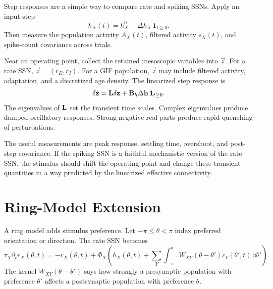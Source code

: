 Step responses are a simple way to compare rate and spiking SSNs. Apply an input step
%
\begin{equation}
  h_X(t)
  =
  h_X^0+\Delta h_X\,\mathbf{1}_{t\ge 0}.
  \label{eq:ssn-step-input}
\end{equation}
%
Then measure the population activity $A_X(t)$, filtered activity $s_X(t)$, and spike-count covariance across trials.

Near an operating point, collect the retained mesoscopic variables into $\vec z$. For a rate SSN, $\vec z=(r_E,r_I)$. For a GIF population, $\vec z$ may include filtered activity, adaptation, and a discretized age density. The linearized step response is
%
\begin{equation}
  \delta\dot{\mathbf{z}}
  =
  \mathbf{L}\delta\mathbf{z}+\mathbf{B}_h\Delta\mathbf{h}\,\mathbf{1}_{t\ge 0}.
  \label{eq:gif-ssn-step-linearization}
\end{equation}
%
The eigenvalues of $\mathbf{L}$ set the transient time scales. Complex eigenvalues produce damped oscillatory responses. Strong negative real parts produce rapid quenching of perturbations.

The useful measurements are peak response, settling time, overshoot, and post-step covariance. If the spiking SSN is a faithful mechanistic version of the rate SSN, the stimulus should shift the operating point and change these transient quantities in a way predicted by the linearized effective connectivity.

\section{Ring-Model Extension}
\label{sec:spiking-ssn-ring-model-extension}

A ring model adds stimulus preference. Let $-\pi \le \theta < \pi$ index preferred orientation or direction. The rate SSN becomes
%
\begin{equation}
  \tau_X\partial_t r_X(\theta,t)
  =
  -r_X(\theta,t)
  +
  \Phi_X\!\left(
    h_X(\theta,t)
    +
    \sum_Y
    \int_{-\pi}^{\pi}
    W_{XY}(\theta-\theta')r_Y(\theta',t)\,\dd\theta'
  \right).
  \label{eq:ring-rate-ssn}
\end{equation}
%
The kernel $W_{XY}(\theta-\theta')$ says how strongly a presynaptic population with preference $\theta'$ affects a postsynaptic population with preference $\theta$.

